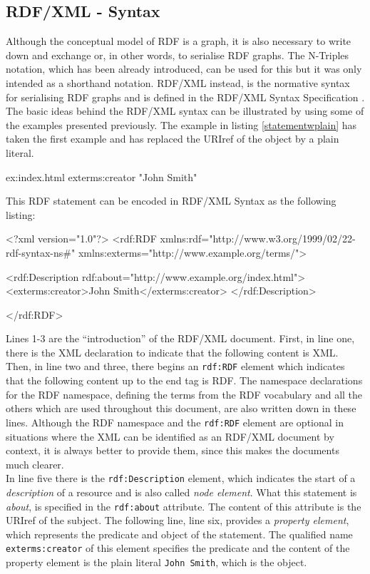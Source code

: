 \documentclass[11pt,a4paper,headsepline, bibtotoc]{scrreprt}
\begin{document}
\subsection{RDF/XML - Syntax}\label{rdfsyntax}
Although the conceptual model of RDF is a graph, it is also necessary to write down and exchange or, in other words, to serialise RDF graphs. The N-Triples notation, which has been already introduced, can be used for this but it was only intended as a shorthand notation. RDF/XML instead, is the normative syntax for serialising RDF graphs and is defined in the RDF/XML Syntax Specification \cite{RDF:Syntax}. The basic ideas behind the RDF/XML syntax can be illustrated by using some of the examples presented previously. The example in listing \ref{statementwplain} has taken the first example and has replaced the URIref of the object by a plain literal.
\begin{blank}[caption=RDF Statement with Plain Literal,label={statementwplain}]
ex:index.html   exterms:creator     "John Smith"
\end{blank}
This RDF statement can be encoded in RDF/XML Syntax as the following listing:
\begin{xmlnb}[caption={RDF/XML for the Creator Concept},label={rdfxml1}]
<?xml version="1.0"?>
<rdf:RDF xmlns:rdf="http://www.w3.org/1999/02/22-rdf-syntax-ns#"
            xmlns:exterms="http://www.example.org/terms/">
    
    <rdf:Description rdf:about="http://www.example.org/index.html">
        <exterms:creator>John Smith</exterms:creator>
    </rdf:Description>

</rdf:RDF>
\end{xmlnb}
Lines 1-3 are the ``introduction'' of the RDF/XML document. First, in line one, there is the XML declaration to indicate that the following content is XML. Then, in line two and three, there begins an \texttt{rdf:RDF} element which indicates that the following content up to the end tag is RDF. The namespace declarations for the RDF namespace, defining the terms from the RDF vocabulary and all the others which are used throughout this document, are also written down in these lines. Although the RDF namespace and the \texttt{rdf:RDF} element are optional in situations where the XML can be identified as an RDF/XML document by context, it is always better to provide them, since this makes the documents much clearer.\\
In line five there is the \texttt{rdf:Description} element, which indicates the start of a \textit{description} of a resource and is also called \textit{node element}. What this statement is \textit{about}, is specified in the \texttt{rdf:about} attribute. The content of this attribute is the URIref of the subject. The following line, line six, provides a \textit{property element}, which represents the predicate and object of the statement. The qualified name \texttt{exterms:creator} of this element specifies the predicate and the content of the property element is the plain literal \texttt{John Smith}, which is the object.\\
\end{document}
